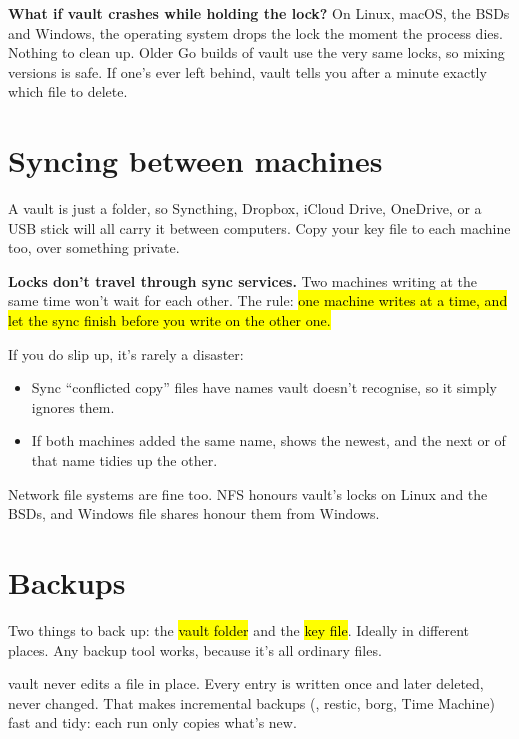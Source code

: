 \documentclass[10pt,oneside,openany]{book}
\begin{document}
\begin{whyso}
\textbf{What if vault crashes while holding the lock?} On Linux, macOS, the
BSDs and Windows, the operating system drops the lock the moment the process
dies. Nothing to clean up. Older Go builds of vault use the very same locks,
so mixing versions is safe. If one's ever left behind,
vault tells you after a minute exactly which file to delete.
\end{whyso}

\section{Syncing between machines}

A vault is just a folder, so Syncthing, Dropbox, iCloud Drive, OneDrive,
 or a USB stick will all carry it between computers. Copy your key
file to each machine too, over something private.

\begin{headsup}
\textbf{Locks don't travel through sync services.} Two machines writing at
the same time won't wait for each other. The rule: \hl{one machine writes at a
time, and let the sync finish before you write on the other one.}
\end{headsup}

If you do slip up, it's rarely a disaster:

\begin{itemize}
  \item Sync ``conflicted copy'' files have names vault doesn't recognise, so
        it simply ignores them.
  \item If both machines added the same name,  shows the newest,
        and the next  or  of that name tidies up the other.
\end{itemize}

Network file systems are fine too. NFS honours vault's locks on Linux and the
BSDs, and Windows file shares honour them from Windows.

\section{Backups}

Two things to back up: the \hl{vault folder} and the \hl{key file}. Ideally
in different places. Any backup tool works, because it's all ordinary files.

\begin{quickwin}
vault never edits a file in place. Every entry is written once and later
deleted, never changed. That makes incremental backups (,
restic, borg, Time Machine) fast and tidy: each run only copies what's new.
\end{quickwin}
\end{document}
